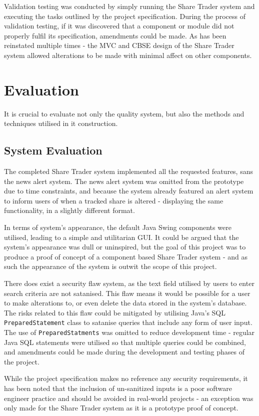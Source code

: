 \documentclass[12pt, a4paper,titlepage]{article}
\begin{document}
Validation testing was conducted by simply running the Share Trader system and
executing the tasks outlined by the project specification.
During the process of validation testing, if it was discovered that a
component or module did not properly fulfil its specification, amendments
could be made.
As has been reinstated multiple times - the MVC and CBSE design of the Share
Trader system allowed alterations to be made with minimal affect on other
components.


\section{Evaluation}
It is crucial to evaluate not only the quality system, but also the methods and
techniques utilised in it construction.

\subsection{System Evaluation}
The completed Share Trader system implemented all the requested features, sans
the news alert system. 
The news alert system was omitted from the prototype due to time constraints,
and because the system already featured an alert system to inform users of
when a tracked share is altered - displaying the same functionality, in a
slightly different format.

In terms of system’s appearance, the default Java Swing components were
utilised, leading to a simple and utilitarian GUI. 
It could be argued that the system's appearance was dull or uninspired, but
the goal of this project was to produce a proof of concept of a component
based Share Trader system - and as such the appearance of the system is outwit
the scope of this project.

There does exist a security flaw system, as the text field utilised by users
to enter search criteria are not satanised. 
This flaw means it would be
possible for a user to make alterations to, or even delete the data stored in
the system’s database. 
The risks related to this flaw could be mitigated by
utilising Java's SQL {\tt PreparedStatement} class to satanise queries that
include any form of user input.
The use of {\tt PreparedStatments} was omitted to reduce
development time - regular Java SQL statements were utilised so that multiple
queries could be combined, and amendments could be made during the development
and testing phases of the project.  

While the project specification makes no reference any security requirements,
it has been noted that the inclusion of un-sanitized inputs is a poor software
engineer practice and should be avoided in real-world projects - an exception
was only made for the Share Trader system as it is a prototype proof of
concept.
\end{document}
